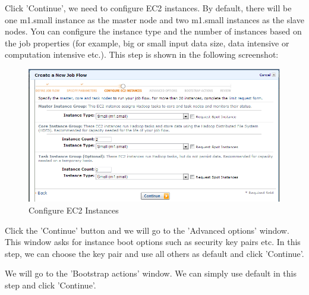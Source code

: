 Click 'Continue', we need to configure EC2 instances. By default, there will be one m1.small instance as the master node and two m1.small instances as the slave nodes. You can configure the instance type and the number of instances based on the job properties (for example, big or small input data size, data intensive or computation intensive etc.). This step is shown in the following screenshot:

\begin{figure}[ht]
  \centering
  \includegraphics[width=.8\textwidth]{figs/5163os_08_26.png}
  \caption{Configure EC2 Instances}\label{fig:aws.elasticmapred.config.instance}
\end{figure} 
Click the 'Continue' button and we will go to the 'Advanced options' window. This window asks for instance boot options such as security key pairs etc. In this step, we can choose the key pair and use all others as default and click 'Continue'.

We will go to the 'Bootstrap actions' window. We can simply use default in this step and click 'Continue'.

